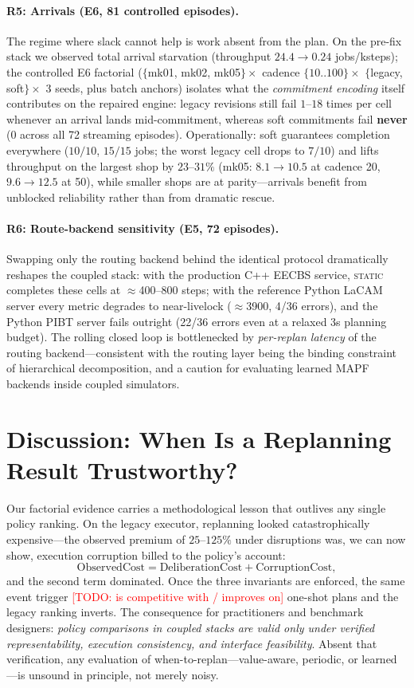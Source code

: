 \documentclass[twocolumn]{article}
\newcommand{\todo}[1]{\textcolor{red}{[TODO: #1]}}
\begin{document}
\paragraph{R5: Arrivals (E6, 81 controlled episodes).}
The regime where slack cannot help is work absent from the plan. On the
pre-fix stack we observed total arrival starvation (throughput
$24.4\to0.24$ jobs/ksteps); the controlled E6 factorial
($\{$mk01, mk02, mk05$\}\times$ cadence $\{10..100\}\times$
$\{$legacy, soft$\}\times$ 3 seeds, plus batch anchors) isolates what
the \emph{commitment encoding} itself contributes on the repaired
engine: legacy revisions still fail $1$--$18$ times per cell whenever
an arrival lands mid-commitment, whereas soft commitments fail
\textbf{never} ($0$ across all 72 streaming episodes). Operationally:
soft guarantees completion everywhere ($10/10$, $15/15$ jobs; the worst
legacy cell drops to $7/10$) and lifts throughput on the largest shop
by $23$--$31\%$ (mk05: $8.1\to10.5$ at cadence 20, $9.6\to12.5$ at 50),
while smaller shops are at parity---arrivals benefit from unblocked
reliability rather than from dramatic rescue.

\paragraph{R6: Route-backend sensitivity (E5, 72 episodes).}
Swapping only the routing backend behind the identical protocol
dramatically reshapes the coupled stack: with the production C++
EECBS service, \textsc{static} completes these cells at
$\approx$400--800 steps; with the reference Python LaCAM server every
metric degrades to near-livelock ($\approx$3900, 4/36 errors), and the
Python PIBT server fails outright (22/36 errors even at a relaxed 3s
planning budget). The rolling closed loop is bottlenecked by
\emph{per-replan latency} of the routing backend---consistent with the
routing layer being the binding constraint of hierarchical
decomposition, and a caution for evaluating learned MAPF backends
inside coupled simulators.

\section{Discussion: When Is a Replanning Result Trustworthy?}
Our factorial evidence carries a methodological lesson that outlives any
single policy ranking. On the legacy executor, replanning looked
catastrophically expensive---the observed premium of
$25$--$125\%$ under disruptions was, we can now show, execution
corruption billed to the policy's account:
\[
\mathrm{ObservedCost}=\mathrm{DeliberationCost}+\mathrm{CorruptionCost},
\]
and the second term dominated. Once the three invariants are enforced,
the same event trigger \todo{is competitive with / improves on} one-shot
plans and the legacy ranking inverts. The consequence for practitioners
and benchmark designers: \emph{policy comparisons in coupled stacks are
valid only under verified representability, execution consistency, and
interface feasibility}. Absent that verification, any evaluation of
when-to-replan---value-aware, periodic, or learned---is unsound in
principle, not merely noisy.
\end{document}
